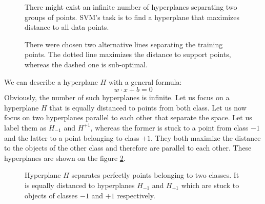 \begin{figure}[t!]
\centering
\begin{minipage}[t!]{0.45\linewidth}
  
  \caption{There might exist an infinite number of hyperplanes separating two groups of points. SVM's task is to find a hyperplane that maximizes distance to all data points.}
  \label{fig:inf_hyperplanes}
\end{minipage}
\quad
\begin{minipage}[t!]{0.45\linewidth}
  
  \caption{There were chosen two alternative lines separating the training points. The dotted line maximizes the distance to support points, whereas the dashed one is sub-optimal.}
  \label{fig:optimal_and_suboptimal}
\end{minipage}
\end{figure}

We can describe a hyperplane $H$ with a general formula:
\begin{equation}
w \cdot x+b = 0
\end{equation}
Obviously, the number of such hyperplanes is infinite. Let us focus on a hyperplane $H$ that is equally distanced to points from both class. Let us now focus on two hyperplanes parallel to each other that separate the space. Let us label them as $H_{-1}$ and $H^{+1}$, whereas the former is stuck to a point from class $-1$ and the latter to a point belonging to class $+1$. They both maximize the distance to the objects of the other class and therefore are parallel to each other. These hyperplanes are shown on the figure \ref{fig:two_hyperplanes}.

\begin{figure}[htbp]
  \centering
  
  \caption{Hyperplane $H$ separates perfectly points belonging to two classes. It is equally distanced to hyperplanes $H_{-1}$ and $H_{+1}$ which are stuck to objects of classes $-1$ and $+1$ respectively.}
  \label{fig:two_hyperplanes}
\end{figure}


